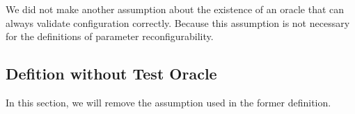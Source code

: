 We did not make another assumption about the existence of an oracle that can always validate configuration correctly. Because this assumption is not necessary for the definitions of parameter reconfigurability.


\subsection{Defition without Test Oracle}
In this section, we will remove the assumption used in the former definition.












